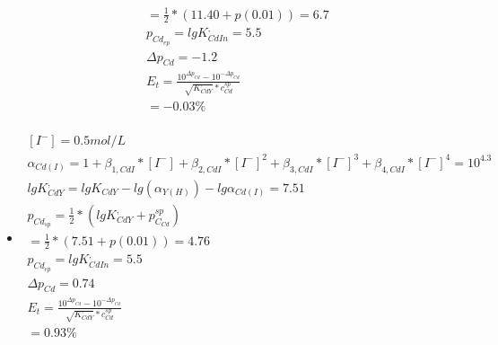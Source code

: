\documentclass{article}
\begin{document}
\begin{itemize}
\begin{equation}
\begin{multlined}
            =\frac{1}{2}*(11.40 + p(0.01)) = 6.7\\
            p_{Cd}_{ep} = lgK^{,}_{CdIn} = 5.5\\
            \Delta p_{Cd} = -1.2\\
            E_t = \frac{10^{\Delta p_{Cd}}-10^{-\Delta p_{Cd}}}{\sqrt{K^,_{CdY}}*c^{sp}_{Cd}}\\
            = -0.03\%\\
        \end{multlined}
    \end{equation}
    \item
    \begin{equation}
        \begin{multlined}
            [I^-] = 0.5 mol/L\\
            \alpha_{Cd(I)} = 1 + \beta_{1,CdI}*[I^-] + \beta_{2,CdI}*[I^-]^2 + \beta_{3,CdI} * [I^-]^3 + \beta_{4,CdI}*[I^-]^4 = 10^{4.3}\\
        lgK^{,}_{CdY} = lgK_{CdY} - lg(\alpha_{Y(H)}) - lg \alpha_{Cd(I)}= 7.51\\
        p_{Cd}_{sp} = \frac{1}{2}*(lg K^{,}_{CdY} + p_{C_{Cd}}^{sp})\\
            =\frac{1}{2}*(7.51 + p(0.01)) = 4.76\\
            p_{Cd}_{ep} = lgK^{,}_{CdIn} = 5.5\\
            \Delta p_{Cd} = 0.74\\
            E_t = \frac{10^{\Delta p_{Cd}}-10^{-\Delta p_{Cd}}}{\sqrt{K^,_{CdY}}*c^{sp}_{Cd}}\\
            = 0.93\%\\
        \end{multlined}
    \end{equation}
\end{itemize}
\end{document}
